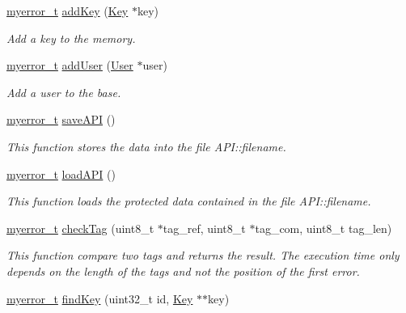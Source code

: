 \begin{DoxyCompactItemize}
\item 
\hyperlink{error_8hpp_acabd2917084445509becf54ab64a4bd0}{myerror\+\_\+t} \hyperlink{classAPI_a33f903bf549583040cbd4ced79821686}{add\+Key} (\hyperlink{classKey}{Key} $\ast$key)
\begin{DoxyCompactList}\small\item\em Add a key to the memory. \end{DoxyCompactList}\item 
\hyperlink{error_8hpp_acabd2917084445509becf54ab64a4bd0}{myerror\+\_\+t} \hyperlink{classAPI_abeba46623895fc9d5d831fb8f828e6da}{add\+User} (\hyperlink{classUser}{User} $\ast$user)
\begin{DoxyCompactList}\small\item\em Add a user to the base. \end{DoxyCompactList}\item 
\hyperlink{error_8hpp_acabd2917084445509becf54ab64a4bd0}{myerror\+\_\+t} \hyperlink{classAPI_ae9bf448b00701609e20c2167931b8975}{save\+A\+P\+I} ()
\begin{DoxyCompactList}\small\item\em This function stores the data into the file A\+P\+I\+::filename. \end{DoxyCompactList}\item 
\hyperlink{error_8hpp_acabd2917084445509becf54ab64a4bd0}{myerror\+\_\+t} \hyperlink{classAPI_a015f9ca96d3f5ab8af44fe2fe8e0215a}{load\+A\+P\+I} ()
\begin{DoxyCompactList}\small\item\em This function loads the protected data contained in the file A\+P\+I\+::filename. \end{DoxyCompactList}\item 
\hyperlink{error_8hpp_acabd2917084445509becf54ab64a4bd0}{myerror\+\_\+t} \hyperlink{classAPI_a846602add15817155236ec4ec0f93ef3}{check\+Tag} (uint8\+\_\+t $\ast$tag\+\_\+ref, uint8\+\_\+t $\ast$tag\+\_\+com, uint8\+\_\+t tag\+\_\+len)
\begin{DoxyCompactList}\small\item\em This function compare two tags and returns the result. The execution time only depends on the length of the tags and not the position of the first error. \end{DoxyCompactList}\item 
\hyperlink{error_8hpp_acabd2917084445509becf54ab64a4bd0}{myerror\+\_\+t} \hyperlink{classAPI_af91891e4a2d88f7cab665d9923452963}{find\+Key} (uint32\+\_\+t id, \hyperlink{classKey}{Key} $\ast$$\ast$key)
$$
\end{DoxyCompactItemize}
